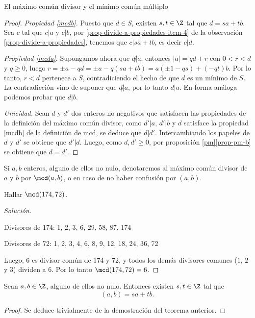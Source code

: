 \begin{section}{El máximo común divisor y el mínimo común
múltiplo}
\begin{proof}
    \textit{Propiedad {\ref{mcdb}}.} Puesto  que $d \in S$,  existen $s, t \in \Z$ tal que $d = sa+tb$. Sea $c$ tal que $c|a$ y $c|b$, por \ref{prop-divide-a-propiedades-item-4} de la observación \ref{prop-divide-a-propiedades},  tenemos que $c|sa+tb$,  es decir $c|d$. 
    
    \textit{Propiedad {\ref{mcda}}.} Supongamos ahora que $d \not| a$,  entonces $|a| = qd + r$ con $0 < r <d$ y $q \ge 0$, luego $r = \pm a - qd = \pm a-q(sa+tb) = a(\pm1-qs) +(-qt)b$. Por lo tanto,  $r < d$  pertenece a $S$, contradiciendo  el hecho de que $d$  es un mínimo de $S$. La contradicción vino de suponer que  $d \not| a$, por lo tanto $d|a$. En  forma análoga podemos probar que $d|b$. 
    
    
    \textit{Unicidad.} Sean $d$ y $d'$ dos enteros no negativos que satisfacen las propiedades de la definición del máximo común divisor, como $d'|a$, $d'|b$ y  $d$ satisface la propiedad {\ref{mcdb}} de la definición de mcd, se deduce que $d|d'$. Intercambiando  los papeles de $d$ y $d'$ se obtiene que $d'|d$. Luego, como $d,d'\ge 0$, por  proposición \ref{pm}\ref{prop-pm-b} se obtiene que $d=d'$.
\end{proof}

Si $a,b$ enteros,  alguno de ellos  no nulo,  denotaremos al máximo común divisor  de $a$ y $b$ por $\mcd(a,b)$, o en caso de no haber confusión por $(a,b)$.



\begin{ejemplo*} Hallar   $\mcd(174,72)$.
    \begin{proof}[Solución] ${^{}}$
        
        Divisores de 174: 1, 2, 3, 6, 29, 58, 87, 174
        
        Divisores de 72: 1, 2, 3, 4, 6, 8, 9, 12, 18, 24, 36, 72 
        
        Luego, $6$ es divisor común de 174 y 72, y todos los demás divisores comunes ($1$, $2$ y $3$) dividen a $6$. Por lo tanto $\mcd(174,72) =6$.
    \end{proof}
\end{ejemplo*}

\begin{proposicion}\label{prop-d-comb-lin}
    Sean $a,b \in \Z$, alguno de ellos no nulo. Entonces existen $s,t \in \Z$ tal que
    \begin{equation*}
    (a,b) = sa + tb. 
    \end{equation*}
\end{proposicion}
\begin{proof}
    Se deduce trivialmente de la demostración del teorema anterior. 
\end{proof}


\end{section}
